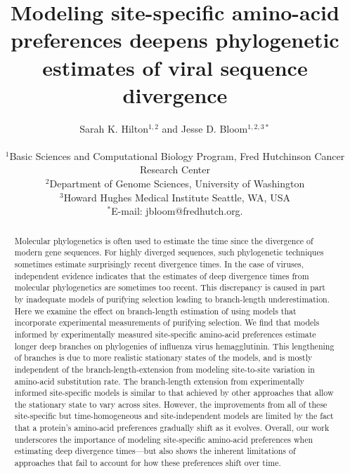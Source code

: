 \documentclass[11pt]{article}
\title{Modeling site-specific amino-acid preferences deepens phylogenetic estimates of viral sequence divergence}
\author
{Sarah K. Hilton$^{1,2}$  and Jesse D. Bloom$^{1,2,3*}$\\
\\
\footnotesize{$^1$Basic Sciences and Computational Biology Program, Fred Hutchinson Cancer Research Center}\\
\footnotesize{$^2$Department of Genome Sciences, University of Washington}\\
\footnotesize{$^3$Howard Hughes Medical Institute}
\footnotesize{Seattle, WA, USA}\\
\footnotesize{$^*$E-mail:  jbloom@fredhutch.org.}\\
}
\date{}
\begin{document}
 


\maketitle 


\begin{abstract}
\noindent  
Molecular phylogenetics is often used to estimate the time since the divergence of modern gene sequences.
For highly diverged sequences, such phylogenetic techniques sometimes estimate surprisingly recent divergence times. 
In the case of viruses, independent evidence indicates that the estimates of deep divergence times from molecular phylogenetics are sometimes too recent.
This discrepancy is caused in part by inadequate models of purifying selection leading to branch-length underestimation.
Here we examine the effect on branch-length estimation of using models that incorporate experimental measurements of purifying selection.
We find that models informed by experimentally measured site-specific amino-acid preferences estimate longer deep branches on phylogenies of influenza virus hemagglutinin.
This lengthening of branches is due to more realistic stationary states of the models, and is mostly independent of the branch-length-extension from modeling site-to-site variation in amino-acid substitution rate.
The branch-length extension from experimentally informed site-specific models is similar to that achieved by other approaches that allow the stationary state to vary across sites.
However, the improvements from all of these site-specific but time-homogeneous and site-independent models are limited by the fact that a protein's amino-acid preferences gradually shift as it evolves.
Overall, our work underscores the importance of modeling site-specific amino-acid preferences when estimating deep divergence times---but also shows the inherent limitations of approaches that fail to account for how these preferences shift over time.
\end{abstract}

\clearpage
\end{document}
